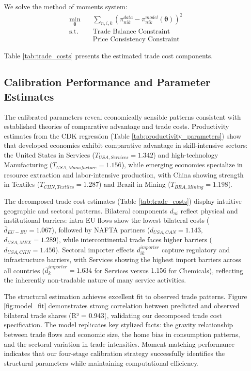 We solve the method of moments system:
\begin{align*}
\min_{\boldsymbol{\theta}} &\quad \sum_{n,i,k} \left( \pi_{nik}^{data} - \pi_{nik}^{model}(\boldsymbol{\theta}) \right)^2 \\
\text{s.t.} & \quad \text{Trade Balance Constraint} \\
& \quad \text{Price Consistency Constraint}
\end{align*}

Table \ref{tab:trade_costs} presents the estimated trade cost components.

\subsection{Calibration Performance and Parameter Estimates}

The calibrated parameters reveal economically sensible patterns consistent with established theories of comparative advantage and trade costs. Productivity estimates from the CDK regression (Table \ref{tab:productivity_parameters}) show that developed economies exhibit comparative advantage in skill-intensive sectors: the United States in Services ($T_{USA,Services} = 1.342$) and high-technology Manufacturing ($T_{USA,Manufacture} = 1.156$), while emerging economies specialize in resource extraction and labor-intensive production, with China showing strength in Textiles ($T_{CHN,Textiles} = 1.287$) and Brazil in Mining ($T_{BRA,Mining} = 1.198$).

The decomposed trade cost estimates (Table \ref{tab:trade_costs}) display intuitive geographic and sectoral patterns. Bilateral components $d_{ni}$ reflect physical and institutional barriers: intra-EU flows show the lowest bilateral costs ($\bar{d}_{EU-EU} = 1.067$), followed by NAFTA partners ($d_{USA,CAN} = 1.143$, $d_{USA,MEX} = 1.289$), while intercontinental trade faces higher barriers ($d_{USA,CHN} = 1.456$). Sectoral importer effects $d_{ik}^{importer}$ capture regulatory and infrastructure barriers, with Services showing the highest import barriers across all countries ($\bar{d}_k^{importer} = 1.634$ for Services versus $1.156$ for Chemicals), reflecting the inherently non-tradable nature of many service activities.

The structural estimation achieves excellent fit to observed trade patterns. Figure \ref{fig:model_fit} demonstrates strong correlation between predicted and observed bilateral trade shares (R² = 0.943), validating our decomposed trade cost specification. The model replicates key stylized facts: the gravity relationship between trade flows and economic size, the home bias in consumption patterns, and the sectoral variation in trade intensities. Moment matching performance indicates that our four-stage calibration strategy successfully identifies the structural parameters while maintaining computational efficiency.

